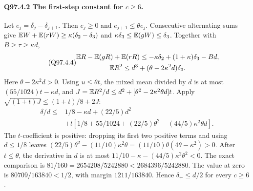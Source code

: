 \paragraph{Q97.4.2 The first-step constant for \(c\ge\allowbreak 6\).}
Let \(e_j=\allowbreak \delta_j-\delta_{j+1}\). Then \(e_j\ge\allowbreak 0\) and
\(e_{j+1}\le\allowbreak \theta e_j\). Consecutive alternating sums give
\(\mathbb E W+\mathbb E(rW)\ge\allowbreak \kappa(\delta_2-\delta_3)\) and
\(\kappa\delta_3\le\allowbreak \mathbb E(gW)\le\allowbreak \delta_3\).
Together with \(B\ge\allowbreak \tau\ge\allowbreak \kappa d\),
\begin{equation}\tag{Q97.4.4}\label{eq:Q97:4.4}
\begin{gathered}
\mathbb E R-\mathbb E(gR)+\mathbb E(rR)\le-\kappa\delta_2+(1+\kappa)\delta_3-Bd,\\
\mathbb E R^2\le d^3+(\theta-2\kappa^2d)\delta_3.
\end{gathered}
\end{equation}
Here \(\theta-2\kappa^2d>\allowbreak 0\). Using \(u\le\allowbreak \theta t\), the mixed mean
divided by \(d\) is at most \((55/1024)t-\kappa d\), and
\(J=\allowbreak \mathbb E R^2/d\le\allowbreak  d^2+[\theta^2-2\kappa^2\theta d]t\).
Apply \(\sqrt{(1+t)J}\le\allowbreak (1+t)/8+2J\):
\begin{equation}\tag{Q97.4.5}\label{eq:Q97:4.5}
\begin{aligned}
\delta/d\le{}&1/8-\kappa d+(22/5)d^2\\
&+t[1/8+55/1024+(22/5)\theta^2-(44/5)\kappa^2\theta d].
\end{aligned}
\end{equation}
The \(t\)-coefficient is positive: dropping its first two positive
terms and using \(d\le\allowbreak 1/8\) leaves
\((22/5)\theta^2-(11/10)\kappa^2\theta
=(11/10)\theta(4\theta-\kappa^2)>0\).
After \(t\le\allowbreak \theta\), the derivative in \(d\) is at most
\(11/10-\kappa-(44/5)\kappa^2\theta^2<\allowbreak 0\).
The exact comparison is
\(81/160=\allowbreak 2654208/5242880<\allowbreak 2684396/5242880\).
The value at zero is \(80709/163840<\allowbreak 1/2\), with margin
\(1211/163840\). Hence \(\delta_+\le\allowbreak  d/2\) for every \(c\ge\allowbreak 6\).

